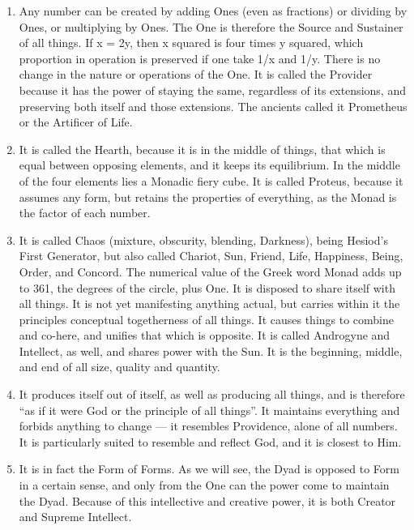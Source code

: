 \begin{enumerate}
\item Any number can be created by adding Ones (even as fractions) or dividing by Ones, or multiplying by Ones. The One is therefore the Source and Sustainer of all things. If x = 2y, then x squared is four times y squared, which proportion in operation is preserved if one take 1/x and 1/y. There is no change in the nature or operations of the One. It is called the Provider because it has the power of staying the same, regardless of its extensions, and preserving both itself and those extensions. The ancients called it Prometheus or the Artificer of Life.

\item It is called the Hearth, because it is in the middle of things, that which is equal between opposing elements, and it keeps its equilibrium. In the middle of the four elements lies a Monadic fiery cube. It is called Proteus, because it assumes any form, but retains the properties of everything, as the Monad is the factor of each number.

\item It is called Chaos (mixture, obscurity, blending, Darkness), being Hesiod's First Generator, but also called Chariot, Sun, Friend, Life, Happiness, Being, Order, and Concord. The numerical value of the Greek word Monad adds up to 361, the degrees of the circle, plus One. It is disposed to share itself with all things. It is not yet manifesting anything actual, but carries within it the principles conceptual togetherness of all things. It causes things to combine and co-here, and unifies that which is opposite. It is called Androgyne and Intellect, as well, and shares power with the Sun. It is the beginning, middle, and end of all size, quality and quantity.

\item It produces itself out of itself, as well as producing all things, and is therefore ``as if it were God or the principle of all things''. It maintains everything and forbids anything to change --- it resembles Providence, alone of all numbers. It is particularly suited to resemble and reflect God, and it is closest to Him.

\item It is in fact the Form of Forms. As we will see, the Dyad is opposed to Form in a certain sense, and only from the One can the power come to maintain the Dyad. Because of this intellective and creative power, it is both Creator and Supreme Intellect.
\end{enumerate}

